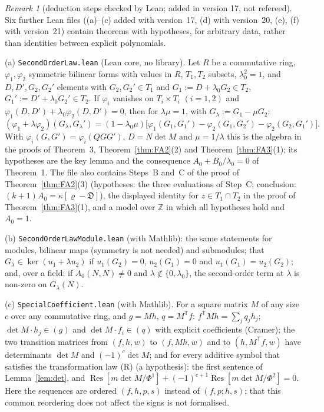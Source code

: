 \documentclass[11pt]{article}
\numberwithin{equation}{section}
\theoremstyle{remark}
\newtheorem{remark}[theorem]{Remark}
\newcommand{\Res}{\operatorname{Res}}
\newcommand{\T}{\mathsf{T}}
\newcommand{\lz}{\lambda_0}
\begin{document}
\begin{remark}[deduction steps checked by Lean; added in version 17, not refereed]\label{rem:lean2}
Six further Lean files ((a)--(c) added with version~17, (d) with version~20, (e), (f) with version~21) contain theorems
with hypotheses, for arbitrary data, rather than identities between explicit polynomials.

(a) \texttt{SecondOrderLaw.lean} (Lean core, no library). Let $R$ be a commutative ring, $\varphi_1,\varphi_2$
symmetric bilinear forms with values in $R$, $T_1,T_2$ subsets, $\lz^2=1$, and $D,D',G_2,G_2'$ elements with
$G_2,G_2'\in T_1$ and $G_1:=D+\lz G_2\in T_2$, $G_1':=D'+\lz G_2'\in T_2$. If $\varphi_i$ vanishes on $T_i\times T_i$
$(i=1,2)$ and $\varphi_1(D,D')+\lz\varphi_2(D,D')=0$, then for $\lambda\mu=1$, with $G_\lambda:=G_1-\mu G_2$:
\[
(\varphi_1+\lambda\varphi_2)(G_\lambda,G_\lambda')=(1-\lz\mu)\bigl[\varphi_1(G_1,G_1')-\varphi_2(G_1,G_2')-\varphi_2(G_2,G_1')\bigr].
\]
With $\varphi_i(G,G')=\varphi_i(QGG')$, $D=N\det M$ and $\mu=1/\lambda$ this is the algebra in the proofs of
Theorem~3, Theorem~\ref{thm:FA2}(2) and Theorem~\ref{thm:FA3}(1); its hypotheses are the key lemma and the
consequence $A_0+B_0/\lz=0$ of Theorem~1. The file also contains Steps~B and~C of the proof of
Theorem~\ref{thm:FA2}(3) (hypotheses: the three evaluations of Step~C; conclusion:
$(k+1)A_0=\kappa[\varrho-\mathfrak D]$), the displayed identity for $z\in T_1\cap T_2$ in the proof of
Theorem~\ref{thm:FA3}(1), and a model over $\mathbb{Z}$ in which all hypotheses hold and $A_0=1$.

(b) \texttt{SecondOrderLawModule.lean} (with Mathlib): the same statements for modules, bilinear maps (symmetry is
not needed) and submodules; that $G_\lambda\in\ker(u_1+\lambda u_2)$ if $u_1(G_2)=0$, $u_2(G_1)=0$ and
$u_1(G_1)=u_2(G_2)$; and, over a field: if $A_0(N,N)\ne0$ and $\lambda\notin\{0,\lz\}$, the second-order term at
$\lambda$ is non-zero on $G_\lambda(N)$.

(c) \texttt{SpecialCoefficient.lean} (with Mathlib). For a square matrix $M$ of any size $c$ over any commutative
ring, and $g=Mh$, $q=M^\T f$: $f^\T Mh=\sum_jq_jh_j$; $\det M\cdot h_j\in(g)$ and $\det M\cdot f_i\in(q)$ with
explicit coefficients (Cramer); the two transition matrices from $(f,h,w)$ to $(f,Mh,w)$ and to $(h,M^\T f,w)$
have determinants $\det M$ and $(-1)^c\det M$; and for every additive symbol that satisfies the transformation
law (R) (a hypothesis): the first sentence of Lemma~\ref{lem:det}, and
$\Res[m\det M/\Phi^1]+(-1)^{c+1}\Res[m\det M/\Phi^2]=0$. Here the sequences are ordered $(f,h,p,s)$ instead of $(f,p;h,s)$; that this common
reordering does not affect the signs is not formalised.


\end{remark}
\end{document}
